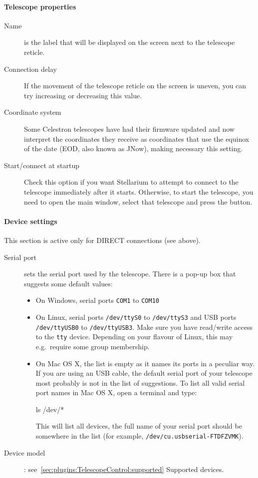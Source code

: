 \paragraph{Telescope properties}

\begin{description}
\item[Name] is the label that will be displayed on the screen next to
  the telescope reticle.
\item[Connection delay] If the movement of the telescope reticle on
  the screen is uneven, you can try increasing or decreasing this
  value.
\item[Coordinate system] Some Celestron telescopes have had their
  firmware updated and now interpret the coordinates they receive as
  coordinates that use the equinox of the date (EOD, also known as
  JNow), making necessary this setting.
\item[Start/connect at startup] Check this option if you want
  Stellarium to attempt to connect to the telescope immediately after
  it starts. Otherwise, to start the telescope, you need to open the
  main window, select that telescope and press the 
  button.
\end{description}

\paragraph{Device settings}
This section is active only for DIRECT connections (see above).

\begin{description}
\item[Serial port] sets the serial port used by the telescope.  There
  is a pop-up box that suggests some default values:
  \begin{itemize}
  \item On Windows, serial ports \texttt{COM1} to \texttt{COM10}
  \item On Linux, serial ports \texttt{/dev/ttyS0} to
    \texttt{/dev/ttyS3} and USB ports \texttt{/dev/ttyUSB0} to
    \texttt{/dev/ttyUSB3}. Make sure you have read/write access to the \texttt{tty} device. 
	Depending on your flavour of Linux, this may e.g.\ require some group membership.
  \item On Mac OS X, the list is empty as it names its ports in a
    peculiar way.
  If you are using an USB cable, the default serial port of your
  telescope most probably is not in the list of suggestions.  To list
  all valid serial port names in Mac OS X, open a terminal and type:

\begin{commands}
  ls /dev/*
\end{commands}
%
This will list all devices, the full name of your serial port should
be somewhere in the list (for example,
\texttt{/dev/cu.usbserial-FTDFZVMK}).
\end{itemize}

\item[Device model]: see~\ref{sec:plugins:TelescopeControl:supported} Supported devices.
\end{description}


